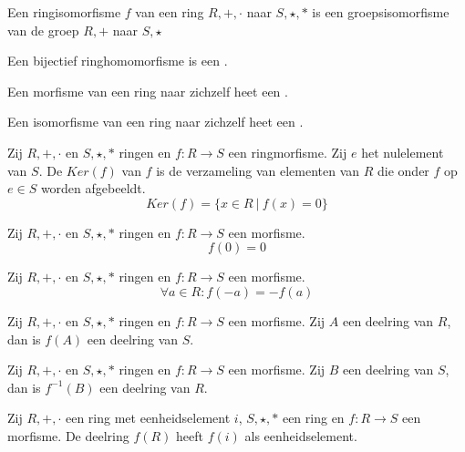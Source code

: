\documentclass[main.tex]{subfiles}
\begin{document}
\begin{opm}
  Een ringisomorfisme $f$ van een ring $R,+,\cdot$ naar $S,\star,*$ is een groepsisomorfisme van de groep $R,+$ naar $S,\star$
\end{opm}

\begin{de}
  Een bijectief ringhomomorfisme is een .
\end{de}

\begin{de}
  Een morfisme van een ring naar zichzelf heet een .
\end{de}

\begin{de}
  Een isomorfisme van een ring naar zichzelf heet een .
\end{de}

\begin{de}
  Zij $R,+,\cdot$ en $S,\star,*$ ringen en $f:R \rightarrow S$ een ringmorfisme.
  Zij $e$ het nulelement van $S$.
  De  $Ker(f)$ van $f$ is de verzameling van elementen van $R$ die onder $f$ op $e\in S$ worden afgebeeldt.
  \[ Ker(f) = \{ x \in R \ |\ f(x) = 0 \} \]
\end{de}

\begin{ei}
  Zij $R,+,\cdot$ en $S,\star,*$ ringen en $f:R \rightarrow S$ een morfisme.
  \[ f(0) = 0 \]
\end{ei}
 
\begin{ei}
  Zij $R,+,\cdot$ en $S,\star,*$ ringen en $f:R \rightarrow S$ een morfisme.
  \[ \forall a \in R: f(-a) = -f(a) \]
\end{ei}

\begin{ei}
  Zij $R,+,\cdot$ en $S,\star,*$ ringen en $f:R \rightarrow S$ een morfisme.
  Zij $A$ een deelring van $R$, dan is $f(A)$ een deelring van $S$.
\end{ei}

\begin{ei}
  Zij $R,+,\cdot$ en $S,\star,*$ ringen en $f:R \rightarrow S$ een morfisme.
  Zij $B$ een deelring van $S$, dan is $f^{-1}(B)$ een deelring van $R$.
\end{ei}

\begin{ei}
  Zij $R,+,\cdot$ een ring met eenheidselement $i$, $S,\star,*$ een ring en $f:R \rightarrow S$ een morfisme.
  De deelring $f(R)$ heeft $f(i)$ als eenheidselement.
\end{ei}
\end{document}

